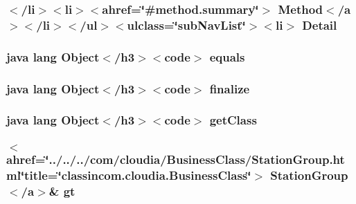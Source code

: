 \hypertarget{_connection_8html_a1e04b5ec07bcd5281e26dcd40e5b3a94}{
\subsubsection[{Detail}]{\setlength{\rightskip}{0pt plus 5cm}$<$/li$>$$<$li$>$$<$ahref=\char`\"{}\#method.\-summary\char`\"{}$>$ Method$<$/{\bf a}$>$$<$/li$>$$<$/ul$>$$<$ulclass=\char`\"{}sub\-Nav\-List\char`\"{}$>$$<$li$>$ Detail}}\label{_connection_8html_a1e04b5ec07bcd5281e26dcd40e5b3a94}
\hypertarget{_connection_8html_a8974318cea585f72df717e0380ec7104}{
\subsubsection[{equals}]{\setlength{\rightskip}{0pt plus 5cm}java lang Object$<$/h3$>$$<$code$>$ equals}}\label{_connection_8html_a8974318cea585f72df717e0380ec7104}
\hypertarget{_connection_8html_ab2315181ead4aeedef2374039b6ddde7}{
\subsubsection[{finalize}]{\setlength{\rightskip}{0pt plus 5cm}java lang Object$<$/h3$>$$<$code$>$ finalize}}\label{_connection_8html_ab2315181ead4aeedef2374039b6ddde7}
\hypertarget{_connection_8html_a98e6644727fe65eac217a6855045be43}{
\subsubsection[{get\-Class}]{\setlength{\rightskip}{0pt plus 5cm}java lang Object$<$/h3$>$$<$code$>$ get\-Class}}\label{_connection_8html_a98e6644727fe65eac217a6855045be43}
\hypertarget{_connection_8html_a972613201c23c386c0171f9864133271}{
\subsubsection[{gt}]{\setlength{\rightskip}{0pt plus 5cm}$<$ahref=\char`\"{}../../../com/cloudia/Business\-Class/Station\-Group.\-html\char`\"{}title=\char`\"{}classincom.\-cloudia.\-Business\-Class\char`\"{}$>$ Station\-Group$<$/{\bf a}$>$\& gt}}\label{_connection_8html_a972613201c23c386c0171f9864133271}

